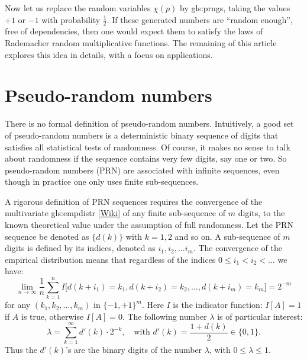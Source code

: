 \documentclass[oneside,10pt]{book}
\begin{document}
Now let us replace the random variables $\chi(p)$ by \glspl{gls:prng}, taking the values $+1$
 or $-1$ with probability $\frac{1}{2}$. If these generated numbers are ``random enough'', free of dependencies, then one would expect them to
 satisfy the laws of Rademacher random multiplicative functions. The remaining of this article explores this idea in
 details, with a focus on applications.

\section{Pseudo-random numbers}

There is no formal definition of pseudo-random numbers. Intuitively, a good set of pseudo-random numbers is a
deterministic binary sequence of digits that satisfies all statistical tests of randomness. Of course, it makes no sense to talk about
randomness if the sequence contains very few digits, say one or two. So pseudo-random numbers (PRN) are associated with
 infinite sequences, even though in practice one only uses finite sub-sequences.


A rigorous definition of PRN sequences requires the convergence of the
multivariate \gls{gls:empdistr}
 [\href{https://en.wikipedia.org/wiki/Empirical_distribution_function}{Wiki}]
 of any finite sub-sequence of $m$ digits, to the known theoretical value under the assumption of full randomness.  Let the PRN
sequence be denoted as $\{d(k)\}$ with $k=1,2$ and so on. A sub-sequence of $m$ digits is defined by its indices, denoted as $i_1,i_2,\dots i_m$.  The convergence of the empirical distribution means that regardless
of the indices $0\leq i_1 < i_2< \dots$ we have:
\begin{equation}
 \lim_{n\rightarrow\infty} \frac{1}{n}\sum_{k=1}^n I\Big[d(k+i_1)=k_1,d(k+i_2)=k_2,\dots,d(k+i_m)=k_m\Big] = 2^{-m} \label{eqrdv}
\end{equation}
for any $(k_1,k_2,\dots,k_m)$ in $\{-1,+1\}^m$. Here $I$ is the indicator function: $I[A]=1$ if $A$ is true, otherwise $I[A]=0$. The following number $\lambda$ is of particular interest:
\begin{equation}
\lambda=\sum_{k=1}^\infty d'(k) \cdot 2^{-k}, \quad \text{with } d'(k)=\frac{1+d(k)}{2} \in \{0, 1\}. \label{zzxdx}
\end{equation}
Thus the $d'(k)$'s are the binary digits of the number $\lambda$, with $0\leq \lambda\leq 1$.
\end{document}
